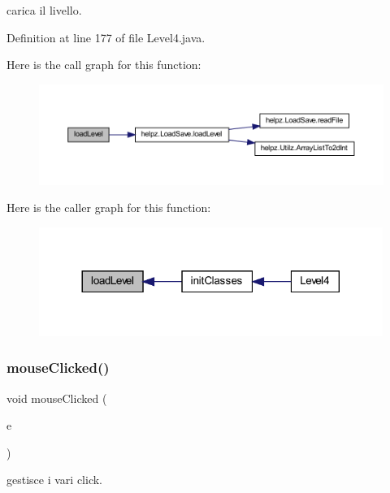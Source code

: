 carica il livello. 



Definition at line 177 of file Level4.\+java.

Here is the call graph for this function\+:\nopagebreak
\begin{figure}[H]
\begin{center}
\leavevmode
\includegraphics[width=350pt]{classscenes_1_1_level4_a286931cc46e197f4a85af7229fdc29a4_cgraph}
\end{center}
\end{figure}
Here is the caller graph for this function\+:\nopagebreak
\begin{figure}[H]
\begin{center}
\leavevmode
\includegraphics[width=317pt]{classscenes_1_1_level4_a286931cc46e197f4a85af7229fdc29a4_icgraph}
\end{center}
\end{figure}
\mbox{\label{classscenes_1_1_level4_a45d56bd84238e8b56589dfc732e2b2cf}} 
\subsubsection{\texorpdfstring{mouse\+Clicked()}{mouseClicked()}}
{\footnotesize\ttfamily void mouse\+Clicked (\begin{DoxyParamCaption}\item[{Mouse\+Event}]{e }\end{DoxyParamCaption})}



gestisce i vari click. 


